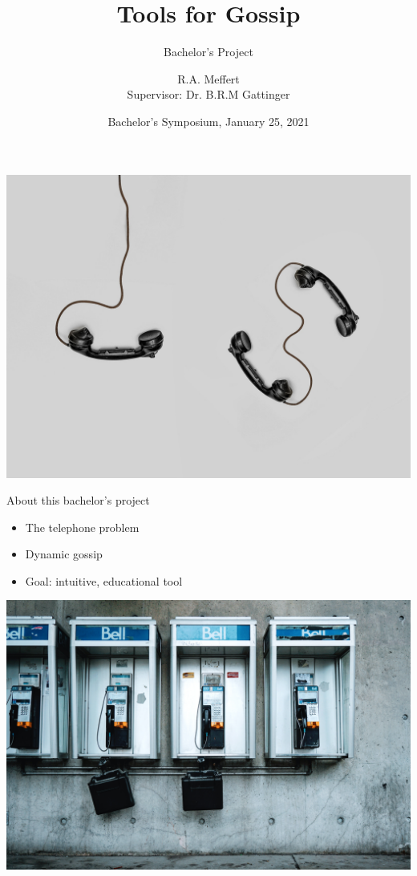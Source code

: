\documentclass[aspectratio=169]{beamer}
\title{Tools for Gossip}
\subtitle{Bachelor's Project}
\author{%
    R.A. Meffert\\\vspace{5pt}
    {\small Supervisor: Dr. B.R.M Gattinger} 
}
\institute{University of Groningen}
\date{Bachelor's Symposium, January 25, 2021}
\begin{document}
{
{\includegraphics[width=\paperwidth,keepaspectratio]{phone.jpg}}
\frame{\titlepage}
}
\begin{frame}[c]{About this bachelor's project}
    \begin{multicols}{2}
        \begin{itemize}
            \item<1-> The telephone problem \parencite[e.g.][]{tijdeman_telephone_1971}
            \item<2-> Dynamic gossip \cite{van_ditmarsch_dynamic_2018}
            \item<3-> Goal: intuitive, educational tool
        \end{itemize}
        \columnbreak
        \includegraphics[width=\linewidth]{telephones.jpg}
        \end{multicols}
\end{frame}
\end{document}
